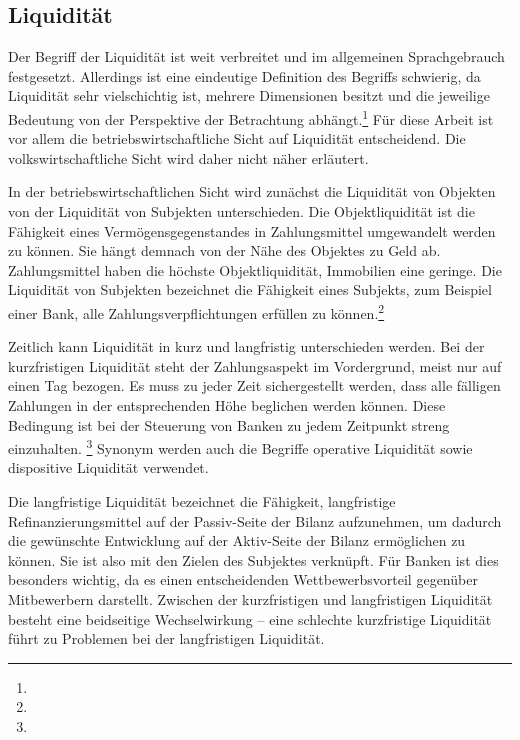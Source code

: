 \begin{onehalfspacing}
\section{Liquidität} 
Der Begriff der Liquidität ist weit verbreitet und im allgemeinen Sprachgebrauch festgesetzt. Allerdings ist eine eindeutige Definition des Begriffs schwierig, da Liquidität sehr vielschichtig ist, mehrere Dimensionen besitzt und die jeweilige Bedeutung von der Perspektive der Betrachtung abhängt.\footnote{ } Für diese Arbeit ist vor allem die betriebswirtschaftliche Sicht auf Liquidität entscheidend. Die volkswirtschaftliche Sicht wird daher nicht näher erläutert.

In der betriebswirtschaftlichen Sicht wird zunächst die Liquidität von Objekten von der Liquidität von Subjekten unterschieden. Die Objektliquidität ist die Fähigkeit eines Vermögensgegenstandes in Zahlungsmittel umgewandelt werden zu können. Sie hängt demnach von der Nähe des Objektes zu Geld ab. Zahlungsmittel haben die höchste Objektliquidität, Immobilien eine geringe. Die Liquidität von Subjekten bezeichnet die Fähigkeit eines Subjekts, zum Beispiel einer Bank, alle Zahlungsverpflichtungen erfüllen zu können.\footnote{ }

Zeitlich kann Liquidität in kurz und langfristig unterschieden werden. Bei der kurzfristigen Liquidität steht der Zahlungsaspekt im Vordergrund, meist nur auf einen Tag bezogen. Es muss zu jeder Zeit sichergestellt werden, dass alle fälligen Zahlungen in der entsprechenden Höhe beglichen werden können. Diese Bedingung ist bei der Steuerung von Banken zu jedem Zeitpunkt streng einzuhalten. \footnote{ } Synonym werden auch die Begriffe operative Liquidität sowie dispositive Liquidität verwendet.

Die langfristige Liquidität bezeichnet die Fähigkeit, langfristige Refinanzierungsmittel auf der Passiv-Seite der Bilanz aufzunehmen, um dadurch die gewünschte Entwicklung auf der Aktiv-Seite der Bilanz ermöglichen zu können. Sie ist also mit den Zielen des Subjektes verknüpft. Für Banken ist dies besonders wichtig, da es einen entscheidenden Wettbewerbsvorteil gegenüber Mitbewerbern darstellt. Zwischen der kurzfristigen und langfristigen Liquidität besteht eine beidseitige Wechselwirkung -- eine schlechte kurzfristige Liquidität führt zu Problemen bei der langfristigen Liquidität.


\end{onehalfspacing}
